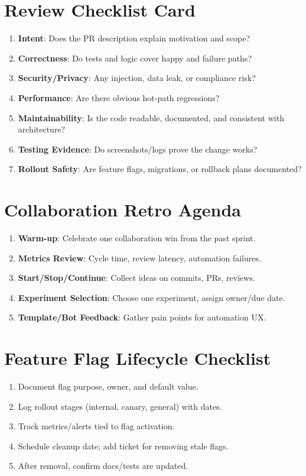 \section{Review Checklist Card}
\begin{enumerate}
  \item \textbf{Intent}: Does the PR description explain motivation and scope?
  \item \textbf{Correctness}: Do tests and logic cover happy and failure paths?
  \item \textbf{Security/Privacy}: Any injection, data leak, or compliance risk?
  \item \textbf{Performance}: Are there obvious hot-path regressions?
  \item \textbf{Maintainability}: Is the code readable, documented, and consistent with architecture?
  \item \textbf{Testing Evidence}: Do screenshots/logs prove the change works?
  \item \textbf{Rollout Safety}: Are feature flags, migrations, or rollback plans documented?
\end{enumerate}

\section{Collaboration Retro Agenda}
\begin{enumerate}
  \item \textbf{Warm-up}: Celebrate one collaboration win from the past sprint.
  \item \textbf{Metrics Review}: Cycle time, review latency, automation failures.
  \item \textbf{Start/Stop/Continue}: Collect ideas on commits, PRs, reviews.
  \item \textbf{Experiment Selection}: Choose one experiment, assign owner/due date.
  \item \textbf{Template/Bot Feedback}: Gather pain points for automation UX.
\end{enumerate}

\section{Feature Flag Lifecycle Checklist}
\begin{enumerate}
  \item Document flag purpose, owner, and default value.
  \item Log rollout stages (internal, canary, general) with dates.
  \item Track metrics/alerts tied to flag activation.
  \item Schedule cleanup date; add ticket for removing stale flags.
  \item After removal, confirm docs/tests are updated.
\end{enumerate}

